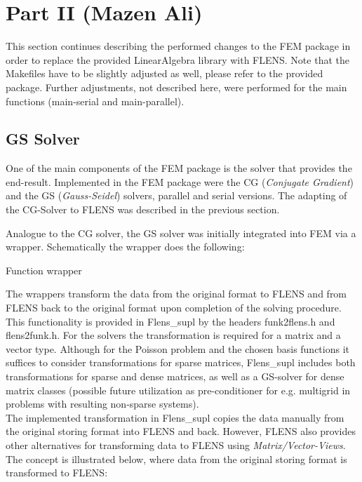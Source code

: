 \section{Part II (Mazen Ali)}
This section continues describing the performed changes to the FEM package in order to replace the provided LinearAlgebra library with FLENS. Note that the Makefiles have to be slightly adjusted as well, please refer to the provided package. Further adjustments, not described here, were performed for the main functions (main-serial and main-parallel).

\subsection{GS Solver}\label{subsc:GS_solver}
One of the main components of the FEM package is the solver that provides the end-result. Implemented in the FEM package were the CG (\emph{Conjugate Gradient}) and the GS (\emph{Gauss-Seidel}) solvers, parallel and serial versions. The adapting of the CG-Solver to FLENS was described in the previous section.

Analogue to the CG solver, the GS solver was initially integrated into FEM via a wrapper. Schematically the wrapper does the following:
\begin{center}

\center
Function wrapper
\end{center}

The wrappers transform the data from the original format to FLENS and from FLENS back to the original format upon completion of the solving procedure. This functionality is provided in Flens\_supl by the headers funk2flens.h and flens2funk.h. For the solvers the transformation is required for a matrix and a vector type. Although for the Poisson problem and the chosen basis functions it suffices to consider transformations for sparse matrices, Flens\_supl includes both transformations for sparse and dense matrices, as well as a GS-solver for dense matrix classes (possible future utilization as pre-conditioner for e.g. multigrid in problems with resulting non-sparse systems).\\
The implemented transformation in Flens\_supl copies the data manually from the original storing format into FLENS and back. However, FLENS also provides other alternatives for transforming data to FLENS using \emph{Matrix/Vector-Views}. The concept is illustrated below, where data from the original storing format is transformed to FLENS:

